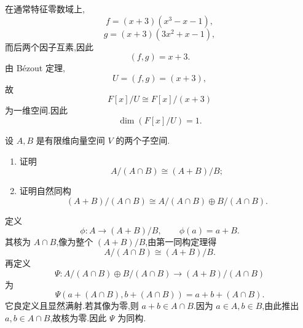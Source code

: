 \begin{solution}
在通常特征零数域上,
\[
f=(x+3)(x^3-x-1),
\]
\[
g=(x+3)(3x^2+x-1),
\]
而后两个因子互素,因此
\[
\boxed{(f,g)=x+3}.
\]
由 Bézout 定理,
\[
U=(f,g)=(x+3),
\]
故
\[
F[x]/U\cong F[x]/(x+3)
\]
为一维空间.因此
\[
\boxed{\dim(F[x]/U)=1}.
\]
\end{solution}

\begin{example}
设 $A,B$ 是有限维向量空间 $V$ 的两个子空间.
\begin{enumerate}
  \item 证明
  \[
  A/(A\cap B)\cong(A+B)/B;
  \]
  \item 证明自然同构
  \[
  (A+B)/(A\cap B)
  \cong
  A/(A\cap B)\oplus B/(A\cap B).
  \]
\end{enumerate}
\end{example}
\exampleblank

\begin{solution}
定义
\[
\phi:A\to(A+B)/B,
\qquad
\phi(a)=a+B.
\]
其核为 $A\cap B$,像为整个 $(A+B)/B$,由第一同构定理得
\[
\boxed{A/(A\cap B)\cong(A+B)/B}.
\]
再定义
\[
\Psi:
A/(A\cap B)\oplus B/(A\cap B)
\to
(A+B)/(A\cap B)
\]
为
\[
\Psi\left(a+(A\cap B),b+(A\cap B)\right)
=a+b+(A\cap B).
\]
它良定义且显然满射.若其像为零,则 $a+b\in A\cap B$.因为 $a\in A,b\in B$,由此推出 $a,b\in A\cap B$,故核为零.因此 $\Psi$ 为同构.
\end{solution}
